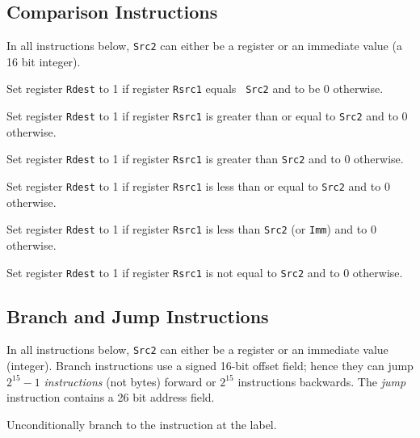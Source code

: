 \subsection {Comparison Instructions}

In all instructions below, {\tt Src2} can either be a register or an
immediate value (a 16 bit integer).

Set register {\tt Rdest} to 1 if register {\tt Rsrc1} equals {\tt
Src2} and to be 0 otherwise.

Set register {\tt Rdest} to 1 if register {\tt Rsrc1} is greater
than or equal to {\tt Src2} and to 0 otherwise.

Set register {\tt Rdest} to 1 if register {\tt Rsrc1} is greater
than {\tt Src2} and to 0 otherwise.

Set register {\tt Rdest} to 1 if register {\tt Rsrc1} is less than
or equal to {\tt Src2} and to 0 otherwise.

Set register {\tt Rdest} to 1 if register {\tt Rsrc1} is less than
{\tt Src2} (or {\tt Imm}) and to 0 otherwise.

Set register {\tt Rdest} to 1 if register {\tt Rsrc1} is not equal
to {\tt Src2} and to 0 otherwise.


\subsection {Branch and Jump Instructions}

In all instructions below, {\tt Src2} can either be a register or an
immediate value (integer).  Branch instructions use a signed 16-bit
offset field; hence they can jump $2^{15}-1$ {\em instructions\/} (not
bytes) forward or $2^{15}$ instructions backwards.  The {\em jump\/}
instruction contains a 26 bit address field.

Unconditionally branch to the instruction at the label.

